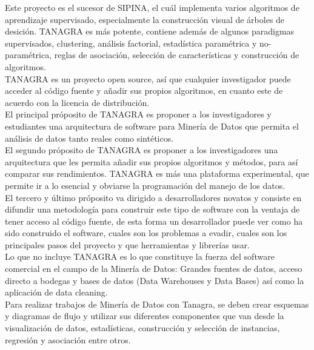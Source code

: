 Este proyecto es el sucesor de SIPINA, el cu\'al implementa varios algoritmos de aprendizaje supervisado,
especialmente la construcci\'on visual de \'arboles de desici\'on. TANAGRA es m\'as potente, contiene adem\'as de
algunos paradigmas supervisados, clustering, an\'alisis factorial, estad\'istica param\'etrica y
no-param\'etrica, reglas de asociaci\'on, selecci\'on de caracter\'isticas y cons\-trucci\'on de algoritmos.\\

TANAGRA es un proyecto open source, as\'i que cualquier investigador puede acceder al c\'odigo fuente y a\~nadir
sus propios algoritmos, en cuanto este de acuerdo con la licencia de distribuci\'on.\\

El principal pr\'oposito de TANAGRA es proponer a los investigadores y estudiantes una arquitectura de software
para Miner\'ia de Datos que permita el an\'alisis de datos tanto reales como sint\'eticos.\\

El segundo pr\'oposito de TANAGRA es proponer a los investigadores una arquitectura que les permita a\~nadir sus
propios algoritmos y m\'etodos, para as\'i comparar sus rendimientos. TANAGRA es m\'as una plataforma
experimental, que permite ir a lo esencial y obviarse la programaci\'on del manejo de los datos.\\

El tercero y \'ultimo pr\'oposito va dirigido a desarrolladores novatos y consiste en difundir una metodolog\'ia
para construir este tipo de software con la ventaja de tener acceso al c\'odigo fuente, de esta forma un
desarrollador puede ver como ha sido construido el software, cuales son los problemas a evadir, cuales son los
principales pasos del proyecto y que herramientas y librer\'ias usar.\\

Lo que no incluye TANAGRA es lo que constituye la fuerza del software comercial en el campo de la Miner\'ia de
Datos: Grandes fuentes de datos, acceso directo a bodegas y bases de datos (Data Warehouses y Data Bases) as\'i
como la aplicaci\'on de data cleaning.\\

Para realizar trabajos de Miner\'ia de Datos con Tanagra, se deben crear esquemas y diagramas de flujo y utilizar
sus diferentes componentes que van desde la visualizaci\'on de datos, estad\'isticas, construcci\'on y
selecci\'on de ins\-tancias, regresi\'on y asociaci\'on entre otros.\\

